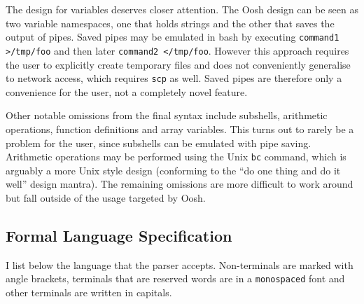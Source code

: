 \documentclass[12pt,twoside,notitlepage]{report}
\begin{document}
The design for variables deserves closer attention. The Oosh design
can be seen as two variable namespaces, one that holds strings and the
other that saves the output of pipes. Saved pipes may be emulated in
bash by executing {\tt command1 >/tmp/foo} and then later {\tt command2
  </tmp/foo}. However this approach requires the user to explicitly
create temporary files and does not conveniently generalise to network
access, which requires {\tt scp} as well. Saved pipes are therefore
only a convenience for the user, not a completely novel feature.

Other notable omissions from the final syntax include subshells,
arithmetic operations, function definitions and array variables. This
turns out to rarely be a problem for the user, since subshells can be
emulated with pipe saving. Arithmetic operations may be performed
using the Unix {\tt bc} command, which is arguably a more Unix style
design (conforming to the ``do one thing and do it well'' design
mantra). The remaining omissions are more difficult to work around but
fall outside of the usage targeted by Oosh.

\subsection{Formal Language Specification}
I list below the language that the parser accepts. Non-terminals are
marked with angle brackets, terminals that are reserved words are in a
{\tt monospaced} font and other terminals are written in capitals.
\end{document}
